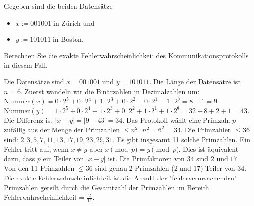 \begin{questions}
\question[3] Gegeben sind die beiden Datensätze
\begin{itemize}
  \item $x := 001001$ in Zürich und
  \item $y := 101011$ in Boston.
\end{itemize}
Berechnen Sie die exakte Fehlerwahrscheinlichkeit des Kommunikationsprotokolls in diesem Fall.
\vspace{40mm}
\begin{solution}
  Die Datensätze sind $x = 001001$ und $y = 101011$.
  Die Länge der Datensätze ist $n=6$.
  Zuerst wandeln wir die Binärzahlen in Dezimalzahlen um:
  $\text{Nummer}(x) = 0 \cdot 2^5 + 0 \cdot 2^4 + 1 \cdot 2^3 + 0 \cdot 2^2 + 0 \cdot 2^1 + 1 \cdot 2^0 = 8 + 1 = 9$.
  $\text{Nummer}(y) = 1 \cdot 2^5 + 0 \cdot 2^4 + 1 \cdot 2^3 + 0 \cdot 2^2 + 1 \cdot 2^1 + 1 \cdot 2^0 = 32 + 8 + 2 + 1 = 43$.
  Die Differenz ist $|x-y| = |9 - 43| = 34$.
  Das Protokoll wählt eine Primzahl $p$ zufällig aus der Menge der Primzahlen $\le n^2$.
  $n^2 = 6^2 = 36$.
  Die Primzahlen $\le 36$ sind: $2, 3, 5, 7, 11, 13, 17, 19, 23, 29, 31$.
  Es gibt insgesamt 11 solche Primzahlen.
  Ein Fehler tritt auf, wenn $x \neq y$ aber $x \pmod p = y \pmod p$. Dies ist äquivalent dazu, dass $p$ ein Teiler von $|x-y|$ ist.
  Die Primfaktoren von $34$ sind $2$ und $17$.
  Von den 11 Primzahlen $\le 36$ sind genau 2 Primzahlen (2 und 17) Teiler von 34.
  Die exakte Fehlerwahrscheinlichkeit ist die Anzahl der "fehlerverursachenden" Primzahlen geteilt durch die Gesamtzahl der Primzahlen im Bereich.
  Fehlerwahrscheinlichkeit = $\frac{2}{11}$.
\end{solution}

\clearpage
\question
{}
\droptotalpoints



\end{questions}
